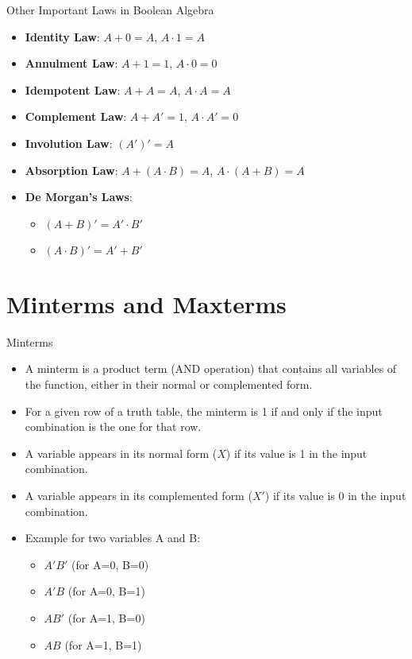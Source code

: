 \documentclass{beamer}
\begin{document}
\begin{frame}{Other Important Laws in Boolean Algebra}
    \begin{itemize}
        \item \textbf{Identity Law}: $A + 0 = A$, $A \cdot 1 = A$
        \item \textbf{Annulment Law}: $A + 1 = 1$, $A \cdot 0 = 0$
        \item \textbf{Idempotent Law}: $A + A = A$, $A \cdot A = A$
        \item \textbf{Complement Law}: $A + A' = 1$, $A \cdot A' = 0$
        \item \textbf{Involution Law}: $(A')' = A$
        
       
        
        \item \textbf{Absorption Law}: $A + (A \cdot B) = A$, $A \cdot (A + B) = A$
        \item \textbf{De Morgan's Laws}:
              \begin{itemize}
                \item $(A + B)' = A' \cdot B'$
                \item $(A \cdot B)' = A' + B'$
              \end{itemize}
    \end{itemize}
\end{frame}



\section{Minterms and Maxterms}

\begin{frame}{Minterms}
    \begin{itemize}
        \item A minterm is a product term (AND operation) that contains all
        variables of the function, either in their normal or complemented form.
        \item For a given row of a truth table, the minterm is 1 if and only if
        the input combination is the one for that row.
        \item A variable appears in its normal form ($X$) if its value is 1 in
        the input combination.
        \item A variable appears in its complemented form ($X'$) if its value is
        0 in the input combination.
        \item Example for two variables A and B:
            \begin{itemize}
                \item $A'B'$ (for A=0, B=0)
                \item $A'B$ (for A=0, B=1)
                \item $AB'$ (for A=1, B=0)
                \item $AB$ (for A=1, B=1)
            \end{itemize}
    \end{itemize}
\end{frame}
\end{document}
